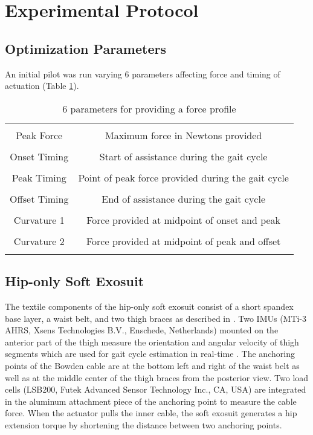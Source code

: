 \section{Experimental Protocol}
\subsection*{Optimization Parameters}
An initial pilot was run varying 6 parameters affecting force and timing of actuation (Table \ref{tab:forceparam}).
\begin{table}[h]
  \centering
  \begin{tabular}{ |c c| }
  \hline
  &\\
  Peak Force & Maximum force in Newtons provided\\
  &\\
  Onset Timing & Start of assistance during the gait cycle\\
  &\\
  Peak Timing & Point of peak force provided during the gait cycle\\
  &\\
  Offset Timing & End of assistance during the gait cycle\\
  &\\
  Curvature 1 & Force provided at midpoint of onset and peak\\
  &\\
  Curvature 2 & Force provided at midpoint of peak and offset\\
  &\\
  \hline
  \end{tabular}
\caption{6 parameters for providing a force profile}
\label{tab:forceparam}
\end{table}

\subsection*{Hip-only Soft Exosuit}
The textile components of the hip-only soft exosuit consist of a short spandex base layer, a waist belt, and two thigh braces as described in \citep{Lee2018}. Two IMUs (MTi-3 AHRS, Xsens Technologies B.V., Enschede, Netherlands) mounted on the anterior part of the thigh measure the orientation and angular velocity of thigh segments which are used for gait cycle estimation in real-time \citep{Ding2016}. The anchoring points of the Bowden cable are at the bottom left and right of the waist belt as well as at the middle center of the thigh braces from the posterior view. Two load cells (LSB200, Futek Advanced Sensor Technology Inc., CA, USA) are integrated in the aluminum attachment piece of the anchoring point to measure the cable force. When the actuator pulls the inner cable, the soft exosuit generates a hip extension torque by shortening the distance between two anchoring points. 

